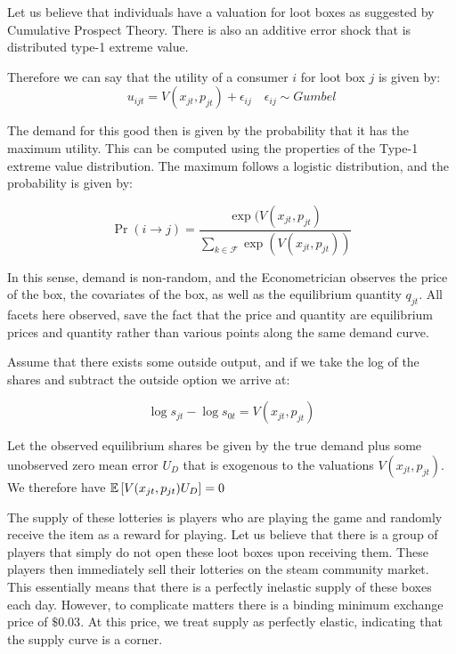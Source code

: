 \documentclass[12pt]{paper}
\begin{document}
Let us believe that individuals have a valuation for loot boxes as
suggested by Cumulative Prospect Theory. There is also an additive
error shock that is distributed type-1 extreme value.

Therefore we can say that the utility of a consumer $i$ for loot box
$j$ is given by:
\begin{equation*}
  u_{ijt} = V( x_{jt}, p_{jt} ) + \epsilon_{ij} \quad \epsilon_{ij} \sim Gumbel
\end{equation*}

The demand for this good then is given by the probability that it has
the maximum utility. This can be computed using the properties of the
Type-1 extreme value distribution. The maximum follows a logistic
distribution, and the probability is given by:

\begin{equation*}
  \Pr( i \rightarrow j ) = \frac{\exp( V(x_{jt},p_{jt})}{ \sum_{k \in \mathcal{F}}
    \exp(V(x_{jt},p_{jt}))}
\end{equation*}

In this sense, demand is non-random, and the Econometrician observes
the price of the box, the covariates of the box, as well as the
equilibrium quantity $q_{jt}$. All facets here observed, save the fact
that the price and quantity are equilibrium prices and quantity rather
than various points along the same demand curve.

Assume that there exists some outside output, and if we take the log
of the shares and subtract the outside option we arrive at:

\begin{equation*}
  \log s_{jt} - \log s_{0t} = V(x_{jt}, p_{jt})
\end{equation*}

Let the observed equilibrium shares be given by the true demand plus
some unobserved zero mean error $U_D$ that is exogenous to the valuations
$V(x_{jt}, p_{jt})$. We therefore have $\mathbb{E} \left [ V(x_{jt},p_{jt})U_D \right ] = 0$

The supply of these lotteries is players who are playing the game and
randomly receive the item as a reward for playing. Let us believe that
there is a group of players that simply do not open these loot boxes
upon receiving them. These players then immediately sell their
lotteries on the steam community market. This essentially means that
there is a perfectly inelastic supply of these boxes each
day. However, to complicate matters there is a binding minimum
exchange price of $\$0.03$. At this price, we treat supply as
perfectly elastic, indicating that the supply curve is a corner.
\end{document}
